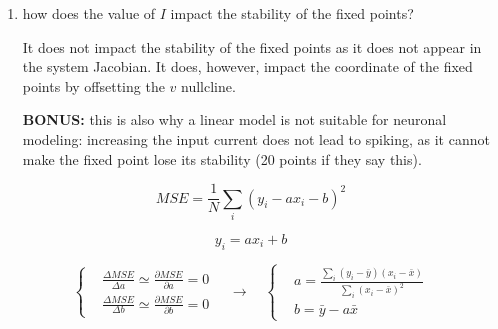 \documentclass[a4paper, 10pt]{article}
\begin{document}
\begin{enumerate}
      We start by solving the characteristic polynomial $P(\lambda)$ associated
      to the system
      \begin{align*}
        &(\lambda - \tau)(\lambda + 2) + 6 = 0\\
        &\lambda^2 + (2-\tau) \lambda + 6 = 0
      \end{align*}
      yielding the following expression for the eigenvalues
      \begin{equation*}
        \lambda_{+/-} = \frac{\tau - 2 \pm \sqrt{(\tau + 2)^2 - 24}}{2}
      \end{equation*}
      The fixed point will have only real eigenvalues when the radicand is
      higher than 0, that is 
      \begin{align*}
        \tau < -\sqrt{24} - 2 \sim -6.8 \quad &or \quad \tau \geq \sqrt{24}-2
        \sim 2.8
      \end{align*}
      Imaginary eigenvalues, on the other hand, require zero real part, which
      can be obtained with $\tau = 2$.

    \item how does the value of $I$ impact the stability of the fixed points?

    It does not impact the stability of the fixed points as it does not appear
    in the system Jacobian. It does, however, impact the coordinate of the fixed
    points by offsetting the $v$ nullcline.

    \textbf{BONUS:} this is also why a linear model is not suitable for neuronal
    modeling: increasing the input current does not lead to spiking, as it
    cannot make the fixed point lose its stability (20 points if they say this).

  \end{enumerate}

  \begin{equation*}
    MSE = \frac{1}{N}\sum_{i}(y_i - ax_i - b)^2
  \end{equation*}

  \begin{equation*}
    y_i = a x_i + b
  \end{equation*}

  \begin{equation*}
    \left\{
    \begin{aligned}
      &\frac{\Delta MSE}{\Delta a} \simeq \frac{\partial MSE}{\partial a} =
      0\\[6pt]
      &\frac{\Delta MSE}{\Delta b} \simeq \frac{\partial MSE}{\partial b} = 0
    \end{aligned} \right. \quad \longrightarrow \quad
    \left\{
    \begin{aligned}
      &a = \frac{\sum_{i}(y_i - \bar{y})(x_i -
      \bar{x})}{\sum_{i}(x_i-\bar{x})^2}\\[6pt]
      &b = \bar{y} - a \bar{x}
    \end{aligned}\right.
  \end{equation*}
\end{document}
